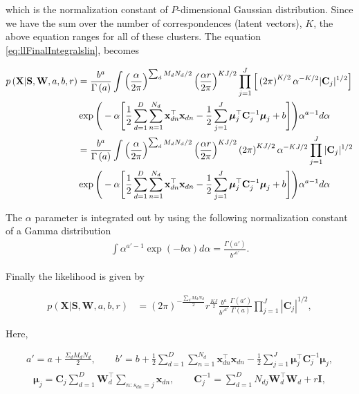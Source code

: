 \documentclass[]{article}
\newcommand{\Cin}{\mathbf{C}_j}
\newcommand{\muJ}{\boldsymbol{\mu}_j}
\newcommand{\gammaA}{\Gamma\left(a\right)}
\newcommand{\Scluster}{\mathbf{S}}
\newcommand{\WIn}{\mathbf{W}}
\newcommand{\indobj}{\mathbf{x}_{dn}}
\begin{document}
which is the normalization constant of $P$-dimensional Gaussian distribution. Since we have the sum over the number of correspondences (latent vectors), $K$, the above equation ranges for all of these clusters. The equation \eqref{eq:llFinalIntegralslin}, becomes

\begin{align}
p\left(\mathbf{X}|\Scluster,\WIn,a,b,r\right) &=\frac{b^a}{\gammaA}\int \left(\frac{\alpha}{2\pi}\right)^{\sum_d M_d N_d /2}\left(\frac{\alpha r}{2\pi}\right)^{KJ/2} \prod_{j=1}^{J}\Big[\left(2\pi\right)^{K/2}\alpha^{-K/2}|\Cin|^{1/2}\Big]
 \notag\\
&\exp\Bigg(-\alpha\Bigg[\frac{1}{2} \sum_{d=1}^{D}\sum_{n=1}^{N_d}\indobj^\top \indobj -\frac{1}{2}\sum_{j=1}^{J}\muJ^\top\Cin^{-1}\muJ +b \Bigg]\Bigg)\alpha^{a-1}d\alpha \\
&=\frac{b^a}{\gammaA}\int \left(\frac{\alpha}{2\pi}\right)^{\sum_d M_d N_d /2}\left(\frac{\alpha r}{2\pi}\right)^{KJ/2} \left(2\pi\right)^{KJ/2}\alpha^{-KJ/2}\prod_{j=1}^{J}|\Cin|^{1/2} \notag\\
&\exp\Bigg(-\alpha\Bigg[\frac{1}{2} \sum_{d=1}^{D}\sum_{n=1}^{N_d}\indobj^\top\indobj -\frac{1}{2}\sum_{j=1}^{J}\muJ^\top\Cin^{-1}\muJ +b \Bigg]\Bigg)\alpha^{a-1}d\alpha\label{eq:llFinalIntegralZlin}
\end{align}

The $\alpha$ parameter is integrated out by using the following normalization constant of a Gamma distribution 
\begin{align}
\int \alpha^{a'-1}\exp\left(-b\alpha\right)d\alpha = \frac{\Gamma\left(a'\right)}{b'^{a'}}.
\end{align}

Finally the likelihood is given by

\begin{align}
p\left(\mathbf{X}|\Scluster,\WIn,a,b,r\right) &=\left(2\pi\right)^{-\frac{\sum_d M_d N_d}{2}}r^{\frac{KJ}{2}}\frac{b^{a}}{b'^{a'}}\frac{\Gamma\left(a'\right)}{\Gamma\left(a\right)}\prod_{j=1}^{J}|\Cin|^{1/2},
\label{eq:llFinalIntegrallastlin}
\end{align}

Here,

\begin{align}
a'=a+{\frac{\Sigma_d M_d N_d}{2}}, \quad \quad b'=b+{\frac{1}{2}}\sum\limits_{d=1}^{D}\sum\limits_{n=1}^{N_d}{\mathbf{x}_{dn}^{\top}\mathbf{x}_{dn}}-{\frac{1}{2}}\sum\limits_{j=1}^{J}\boldsymbol{\mu}_j^\top \mathbf{C}_j^{-1}\boldsymbol{\mu}_j,
\end{align}
\begin{align}
\boldsymbol{\mu}_j =\mathbf{C}_j\sum\limits_{d=1}^{D}{\mathbf{W}_d^\top\sum\limits_{n:s_{dn}=j}{\mathbf{x}_{dn}}}, \quad \quad \mathbf{C}_{j}^{-1} =\sum\limits_{d=1}^{D}{N_{dj}\mathbf{W}_d^\top\mathbf{W}_d+r\mathbf{I}},
\end{align}
\end{document}
